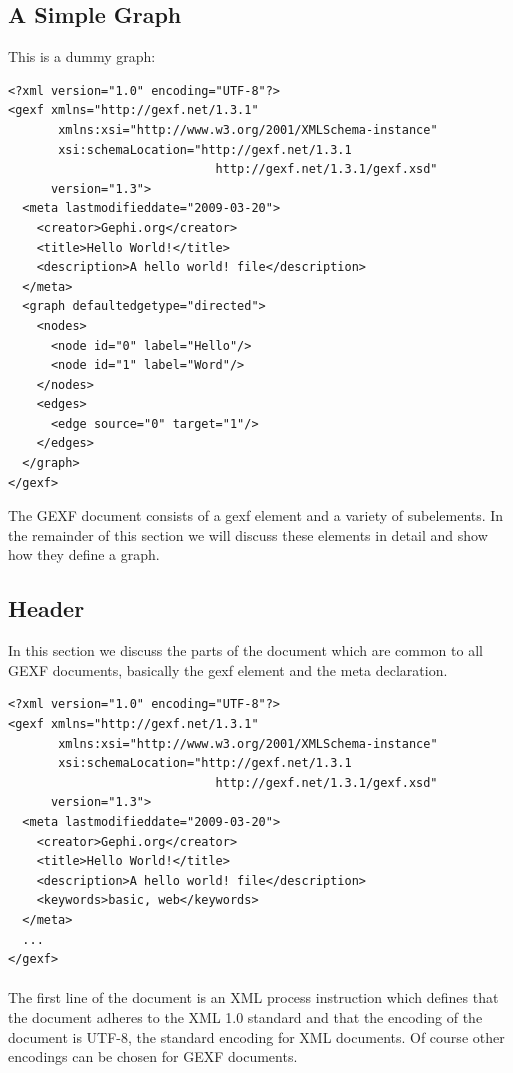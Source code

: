 \documentclass[a4paper,10pt]{article}
\begin{document}
\subsection{A Simple Graph}

This is a dummy graph:

\lstset{ style=gexf }
\begin{lstlisting}[caption={Hello world!},label=helloworld]
<?xml version="1.0" encoding="UTF-8"?>
<gexf xmlns="http://gexf.net/1.3.1"
       xmlns:xsi="http://www.w3.org/2001/XMLSchema-instance"
       xsi:schemaLocation="http://gexf.net/1.3.1
                             http://gexf.net/1.3.1/gexf.xsd"
      version="1.3">
  <meta lastmodifieddate="2009-03-20">
    <creator>Gephi.org</creator>
    <title>Hello World!</title>
    <description>A hello world! file</description>
  </meta>
  <graph defaultedgetype="directed">
    <nodes>
      <node id="0" label="Hello"/>
      <node id="1" label="Word"/>
    </nodes>
    <edges>
      <edge source="0" target="1"/>
    </edges>
  </graph>
</gexf>
\end{lstlisting}

The GEXF document consists of a gexf element and a variety of subelements. In the remainder of this section we will discuss these elements in detail and show how they define a graph.

\subsection{Header}

In this section we discuss the parts of the document which are common to all GEXF documents, basically the gexf element and the meta declaration.

\lstset{ style=gexf }
\begin{lstlisting}[caption={Header},label=header]
<?xml version="1.0" encoding="UTF-8"?>
<gexf xmlns="http://gexf.net/1.3.1"
       xmlns:xsi="http://www.w3.org/2001/XMLSchema-instance"
       xsi:schemaLocation="http://gexf.net/1.3.1
                             http://gexf.net/1.3.1/gexf.xsd"
      version="1.3">
  <meta lastmodifieddate="2009-03-20">
    <creator>Gephi.org</creator>
    <title>Hello World!</title>
    <description>A hello world! file</description>
    <keywords>basic, web</keywords>
  </meta>
  ...
</gexf>
\end{lstlisting}

\paragraph{}
The first line of the document is an XML process instruction which defines that the document adheres to the XML 1.0 standard and that the encoding of the document is UTF-8, the standard encoding for XML documents. Of course other encodings can be chosen for GEXF documents.
\end{document}
